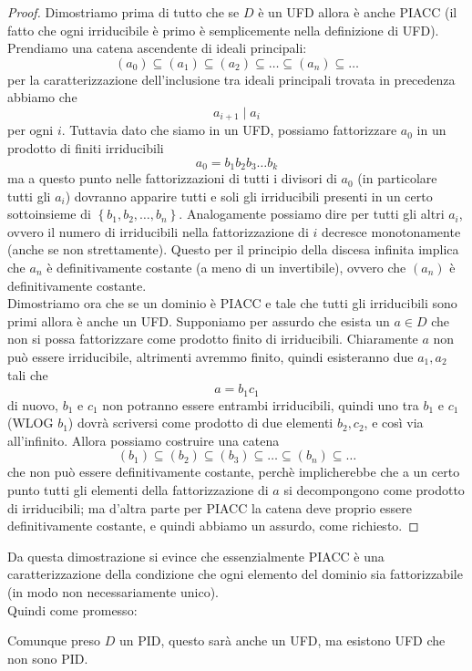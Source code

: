 \documentclass[11pt]{scrartcl}
\begin{document}
	\begin{proof}
		Dimostriamo prima di tutto che se $D$ è un UFD allora è anche PIACC (il fatto che ogni irriducibile è primo è semplicemente nella definizione di UFD). Prendiamo una catena ascendente di ideali principali:
		$$(a_0)\subseteq (a_1)\subseteq (a_2) \subseteq \dots\subseteq (a_n)\subseteq \dots$$
		per la caratterizzazione dell'inclusione tra ideali principali trovata in precedenza abbiamo che 
		$$a_{i+1}\mid a_i$$
		per ogni $i$. Tuttavia dato che siamo in un UFD, possiamo fattorizzare $a_0$ in un prodotto di finiti irriducibili
		$$a_0=b_1b_2b_3\dots b_k$$
		ma a questo punto nelle fattorizzazioni di tutti i divisori di $a_0$ (in particolare tutti gli $a_i$) dovranno apparire tutti e soli gli irriducibili presenti in un certo sottoinsieme di $\left\{b_1,b_2,\dots,b_n\right\}$. Analogamente possiamo dire per tutti gli altri $a_i$, ovvero il numero di irriducibili nella fattorizzazione di $i$ decresce monotonamente (anche se non strettamente). Questo per il principio della discesa infinita implica che $a_n$ è definitivamente costante (a meno di un invertibile), ovvero che $(a_n)$ è definitivamente costante. \\
		Dimostriamo ora che se un dominio è PIACC e tale che tutti gli irriducibili sono primi allora è anche un UFD. Supponiamo per assurdo che esista un $a\in D$ che non si possa fattorizzare come prodotto finito di irriducibili. Chiaramente $a$ non può essere irriducibile, altrimenti avremmo finito, quindi esisteranno due $a_1,a_2$ tali che
		$$a=b_1c_1$$
		di nuovo, $b_1$ e $c_1$ non potranno essere entrambi irriducibili, quindi uno tra $b_1$ e $c_1$ (WLOG $b_1$) dovrà scriversi come prodotto di due elementi $b_2,c_2$, e così via all'infinito. Allora possiamo costruire una catena
		$$(b_1)\subseteq (b_2)\subseteq (b_3)\subseteq \dots \subseteq (b_n) \subseteq \dots$$
		che non può essere definitivamente costante, perchè implicherebbe che a un certo punto tutti gli elementi della fattorizzazione di $a$ si decompongono come prodotto di irriducibili; ma d'altra parte per PIACC la catena deve proprio essere definitivamente costante, e quindi abbiamo un assurdo, come richiesto.
	\end{proof}
	Da questa dimostrazione si evince che essenzialmente PIACC è una caratterizzazione della condizione che ogni elemento del dominio sia fattorizzabile (in modo non necessariamente unico). \\
	Quindi come promesso:
	\begin{corollary}
		Comunque preso $D$ un PID, questo sarà anche un UFD, ma esistono UFD che non sono PID. 
	\end{corollary}
\end{document}
